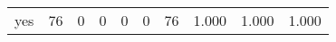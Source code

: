 \begin{longtable}{lp{1.3cm}p{1.3cm}p{1.3cm}p{1.3cm}p{1.3cm}p{1.3cm}p{1.3cm}p{1.3cm}p{1.3cm}}
yes       &                     76 &                                             0 &                                            0 &                                           0 &                                            0 &                                         76 &                                1.000 &                                  1.000 &                                1.000 \\
\end{longtable}
